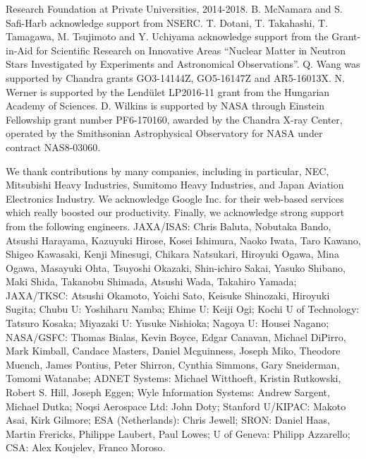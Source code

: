 Research Foundation at Private Universities, 2014-2018.
%
B. McNamara and S. Safi-Harb acknowledge support from NSERC.
%
T. Dotani, T. Takahashi, T. Tamagawa, M. Tsujimoto and Y. Uchiyama acknowledge support
from the Grant-in-Aid for Scientific Research on Innovative Areas ``Nuclear Matter in
Neutron Stars Investigated by Experiments and Astronomical Observations''.
%
Q. Wang was supported by Chandra grants GO3-14144Z, GO5-16147Z and AR5-16013X.
%
N. Werner is supported by the Lend\"ulet LP2016-11 grant from the Hungarian Academy of
Sciences.
%
D. Wilkins is supported by NASA through Einstein Fellowship grant number PF6-170160,
awarded by the Chandra X-ray Center, operated by the Smithsonian Astrophysical
Observatory for NASA under contract NAS8-03060.

We thank contributions by many companies, including in particular, NEC, Mitsubishi Heavy
Industries, Sumitomo Heavy Industries, and Japan Aviation Electronics Industry. We acknowledge
Google Inc. for their web-based services which really boosted our productivity. Finally,
we acknowledge strong support from the following engineers.  JAXA/ISAS: Chris Baluta,
Nobutaka Bando, Atsushi Harayama, Kazuyuki Hirose, Kosei Ishimura, Naoko Iwata, Taro
Kawano, Shigeo Kawasaki, Kenji Minesugi, Chikara Natsukari, Hiroyuki Ogawa, Mina Ogawa,
Masayuki Ohta, Tsuyoshi Okazaki, Shin-ichiro Sakai, Yasuko Shibano, Maki Shida, Takanobu
Shimada, Atsushi Wada, Takahiro Yamada; JAXA/TKSC: Atsushi Okamoto, Yoichi Sato, Keisuke
Shinozaki, Hiroyuki Sugita; Chubu U: Yoshiharu Namba; Ehime U: Keiji Ogi; Kochi U of
Technology: Tatsuro Kosaka; Miyazaki U: Yusuke Nishioka; Nagoya U: Housei Nagano;
NASA/GSFC: Thomas Bialas, Kevin Boyce, Edgar Canavan, Michael DiPirro, Mark Kimball,
Candace Masters, Daniel Mcguinness, Joseph Miko, Theodore Muench, James Pontius, Peter
Shirron, Cynthia Simmons, Gary Sneiderman, Tomomi Watanabe; ADNET Systems: Michael
Witthoeft, Kristin Rutkowski, Robert S. Hill, Joseph Eggen; Wyle Information Systems:
Andrew Sargent, Michael Dutka; Noqsi Aerospace Ltd: John Doty; Stanford U/KIPAC: Makoto
Asai, Kirk Gilmore; ESA (Netherlands): Chris Jewell; SRON: Daniel Haas, Martin Frericks,
Philippe Laubert, Paul Lowes; U of Geneva: Philipp Azzarello; CSA: Alex Koujelev, Franco
Moroso.

